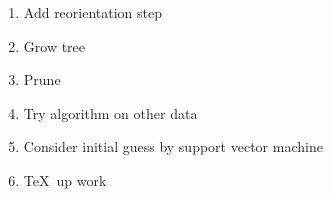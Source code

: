 \documentclass{article}
\begin{document}
\begin{enumerate} 
\item Add reorientation step
\item Grow tree 
\item Prune
\item Try algorithm on other data
\item Consider initial guess by support vector machine
\item \TeX\ up work 
\end{enumerate} 
\end{document}
